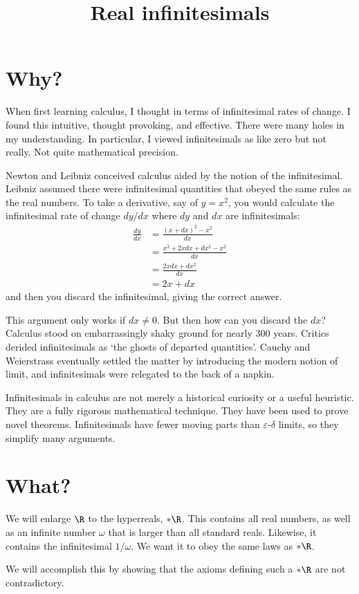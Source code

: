 \documentclass{scrartcl}
\title{Real infinitesimals}
\begin{document}
\section{Why?}
When first learning calculus, I thought in terms of infinitesimal rates of change. I found this intuitive, thought provoking, and effective. There were many holes in my understanding. In particular, I viewed infinitesimals as like zero but not really. Not quite mathematical precision. 

Newton and Leibniz conceived calculus aided by the notion of the infinitesimal. Leibniz assumed there were infinitesimal quantities that obeyed the same rules as the real numbers. To take a derivative, say of $y=x^2$, you would calculate the infinitesimal rate of change $dy/dx$ where $dy$ and $dx$ are infinitesimals: 
\begin{align*}
  \frac{dy}{dx} &= \frac{(x+dx)^2-x^2}{dx} \\
                &= \frac{x^2+2xdx+dx^2-x^2}{dx} \\
                &= \frac{2xdx+dx^2}{dx} \\
                &= 2x+dx
\end{align*}
and then you discard the infinitesimal, giving the correct answer. 

This argument only works if $dx\neq 0$. But then how can you discard the $dx$? Calculus stood on embarrassingly shaky ground for nearly 300 years. Critics derided infinitesimals as `the ghosts of departed quantities'. Cauchy and Weierstrass eventually settled the matter by introducing the modern notion of limit, and infinitesimals were relegated to the back of a napkin. 

Infinitesimals in calculus are not merely a historical curiosity or a useful heuristic. They are a fully rigorous mathematical technique. They have been used to prove novel theorems. Infinitesimals have fewer moving parts than $\varepsilon$-$\delta$ limits, so they simplify many arguments. 

\section{What?}
We will enlarge $\R$ to the hyperreals, $*\R$. This contains all real numbers, as well as an infinite number $\omega$ that is larger than all standard reals. Likewise, it contains the infinitesimal $1/\omega$. We want it to obey the same laws as $*\R$. 

We will accomplish this by showing that the axioms defining such a $*\R$ are not contradictory.
\end{document}
